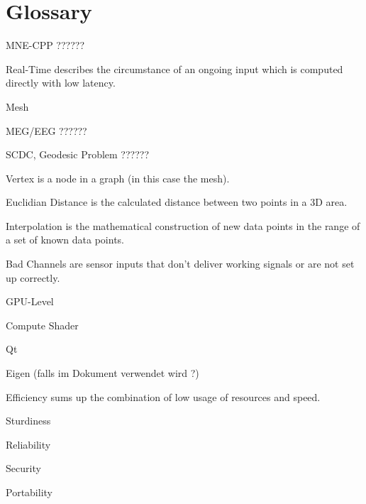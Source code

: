 \section{Glossary}

\begin{aims}
	
	\item[MNE-CPP ??????]
	\item[Real-Time] describes the circumstance of an ongoing input which is computed directly with low latency.
	\item[Mesh]		
	\item[MEG/EEG ??????] 
	\item[SCDC, Geodesic Problem ??????]
	\item[Vertex] is a node in a graph (in this case the mesh).
	\item[Euclidian Distance] is the calculated distance between two points in a 3D area.
	\item[Interpolation] is the mathematical construction of new data points in the range of a set of known data points.
	\item[Bad Channels] are sensor inputs that don't deliver working signals or are not set up correctly.
	\item[GPU-Level]
	\item[Compute Shader]
	\item[Qt] 
	\item[Eigen (falls im Dokument verwendet wird ?)]
	\item[Efficiency] sums up the combination of low usage of resources and speed.
	\item[Sturdiness]
	\item[Reliability]
	\item[Security]
	\item[Portability]
\end{aims}